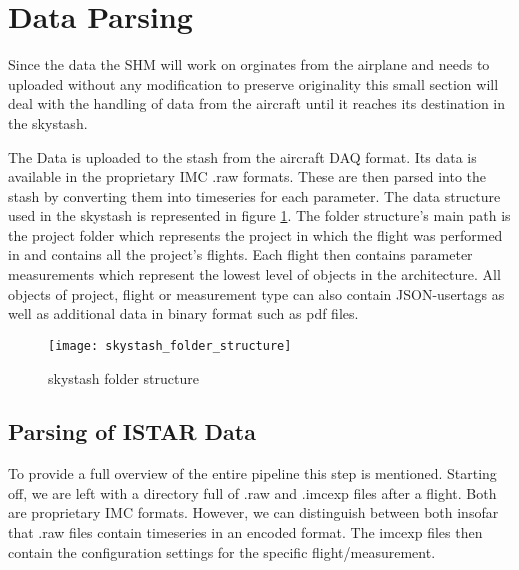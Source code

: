 \section{Data Parsing}

Since the data the SHM will work on orginates from the airplane and needs to uploaded without any modification to preserve originality this small section will deal with the handling of data from the aircraft until it reaches its destination in the skystash.

The Data is uploaded to the stash from the aircraft DAQ format. Its data is available in the proprietary IMC .raw formats. These are then parsed into the stash by converting them into timeseries for each parameter. The data structure used in the skystash is represented in figure \ref{fig:skystash_folder_structure}. The folder structure's main path is the project folder which represents the project in which the flight was performed in and contains all the project's flights. Each flight then contains parameter measurements which represent the lowest level of objects in the architecture. All objects of project, flight or measurement type can also contain JSON-usertags as well as additional data in binary format such as pdf files.

\begin{figure}
    \centering
    \texttt{[image: skystash\_folder\_structure]}
    \caption{skystash folder structure}
    \label{fig:skystash_folder_structure}
\end{figure}

\subsection{Parsing of ISTAR Data}


To provide a full overview of the entire pipeline this step is mentioned. Starting off, we are left with a directory full of .raw and .imcexp files after a flight. Both are proprietary IMC formats. However, we can distinguish between both insofar that .raw files contain timeseries in an encoded format. The imcexp files then contain the configuration settings for the specific flight/measurement.

